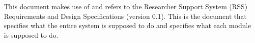 This document makes use of and refers to the Researcher Support System (RSS) Requirements and Design Specifications (version 0.1). This is the document that specifies what the entire system is supposed to do and specifies what each module is supposed to do.